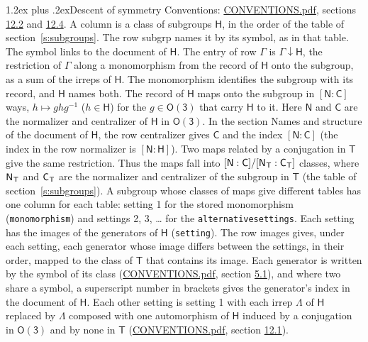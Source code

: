 \documentclass[10pt,a4paper]{article}
\makeatletter
\renewcommand\section{\@startsection{section}{1}{\z@}{-3ex plus -1ex minus -.2ex}%
  {1.2ex plus .2ex}{\normalfont\large\sffamily\bfseries\color{parttitle}}}
\numberwithin{equation}{section}
\newcommand{\grp}[1]{\mathsf{#1}}
\newcommand{\grpindex}[2]{[#1 : #2]}
\newcommand{\restr}[2]{#1\!\downarrow#2}
\newcommand{\hairsp}{\mkern1mu}
\makeatother
\begin{document}
\section{Descent of symmetry}\label{s:subduction}
Conventions: \href{../../CONVENTIONS.pdf}{CONVENTIONS.pdf}, sections \href{../../CONVENTIONS.pdf\#conv.12.2}{12.2} and \href{../../CONVENTIONS.pdf\#conv.12.4}{12.4}.
A column is a class of subgroups $\grp{H}$, in the order of the table of section~\ref{s:subgroups}. The row subgrp names it by its symbol, as in that table. The symbol links to the document of $\grp{H}$. The entry of row $\Gamma$ is $\restr{\Gamma}{\grp{H}}$, the restriction of $\Gamma$ along a monomorphism from the record of $\grp{H}$ onto the subgroup, as a sum of the irreps of $\grp{H}$. The monomorphism identifies the subgroup with its record, and $\grp{H}$ names both. \label{n:group.normalizer.o3}\label{n:group.centralizer.o3}The record of $\grp{H}$ maps onto the subgroup in $\grpindex{\grp{N}}{\grp{C}}$ ways, $h \mapsto g h g^{-1}$ ($h \in \grp{H}$) for the $g \in \grp{O(3)}$ that carry $\grp{H}$ to it. Here $\grp{N}$ and $\grp{C}$ are the normalizer and centralizer of $\grp{H}$ in \href{O3.pdf}{$\grp{O(3)}$}. In the section Names and structure of the document of $\grp{H}$, the row centralizer gives $\grp{C}$ and the index $\grpindex{\grp{N}}{\grp{C}}$ (the index in the row normalizer is $\grpindex{\grp{N}}{\grp{H}}$). Two maps related by a conjugation in $\grp{T}$ give the same restriction. Thus the maps fall into $\grpindex{\grp{N}}{\grp{C}}/\grpindex{\grp{N}_{\hairsp \grp{T}}}{\grp{C}_{\hairsp \grp{T}}}$ classes, where $\grp{N}_{\hairsp \grp{T}}$ and $\grp{C}_{\hairsp \grp{T}}$ are the normalizer and centralizer of the subgroup in $\grp{T}$ (the table of section~\ref{s:subgroups}). \label{n:head.setting}A subgroup whose classes of maps give different tables has one column for each table: setting 1 for the stored monomorphism (\texttt{monomorphism}) and settings 2, 3, \dots{} for the \texttt{alternativesettings}. Each setting has the images of the generators of $\grp{H}$ (\texttt{setting}). \label{n:head.images}The row images gives, under each setting, each generator whose image differs between the settings, in their order, mapped to the class of $\grp{T}$ that contains its image. Each generator is written by the symbol of its class (\href{../../CONVENTIONS.pdf}{CONVENTIONS.pdf}, section \href{../../CONVENTIONS.pdf\#conv.5.1}{5.1}), and where two share a symbol, a superscript number in brackets gives the generator's index in the document of $\grp{H}$. \label{n:irrep.Delta}Each other setting is setting 1 with each irrep $\Lambda$ of $\grp{H}$ replaced by $\Lambda$ composed with one automorphism of $\grp{H}$ induced by a conjugation in \href{O3.pdf}{$\grp{O(3)}$} and by none in $\grp{T}$ (\href{../../CONVENTIONS.pdf}{CONVENTIONS.pdf}, section \href{../../CONVENTIONS.pdf\#conv.12.1}{12.1}).
\end{document}

